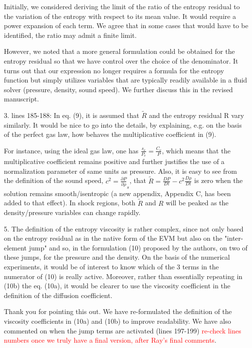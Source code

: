 \documentclass{article}
\newcommand{\tcr}[1]{\textcolor{red}{#1}}
\begin{document}
Initially, we considered deriving the limit of the ratio of the entropy residual to the variation of the entropy with respect to its mean value.  It would require a power expansion of each term. We agree that in some cases that would have to be identified, the ratio may admit a finite limit.

However, we noted that a more general formulation could be obtained for the entropy residual so that we have control over the choice of the denominator. It turns out that our expression no longer requires a formula for the entropy function but simply utilizes variables that are typically readily available in a fluid solver (pressure, density, sound speed). We further discuss this in the revised manuscript. 
\bigskip


{
\color{blue}
3. lines 185-188: In eq. (9), it is assumed that $\tilde{R}$ and the entropy residual R vary similarly. It would be nice to go into the details, by explaining, e.g. on the basis of the perfect gas law, how behaves the multiplicative coefficient in (9). 
}

For instance, using the ideal gas law, one has $\frac{s_e}{P_e} = \frac{C_v}{P}$,  which means that the multiplicative coefficient remains positive and further justifies the use of a normalization parameter of same units as pressure. Also, it is easy to see from the definition of the sound speed, $c^2 = \frac{\partial P}{\partial \rho}_s$, that $\tilde{R} = \frac{DP}{Dt}-c^2 \frac{D\rho}{Dt}$ is zero when the solution remains smooth/isentropic (a new appendix, Appendix C, has been added to that effect). In shock regions, both $\tilde{R}$ and $R$ will be peaked as the density/pressure variables can change rapidly.
\bigskip


{
\color{blue}
5. The definition of the entropy viscosity is rather complex, since not only based on  the entropy residual as in the native form of the EVM but also on  the "inter-element jump" and so, in the formulation (10) proposed by the authors, on two of these jumps, for the pressure and the density. On the basis of the numerical experiments, it  would be of interest to know which of the 3 terms in the numerator of (10) is really active.  Moreover, rather than essentially repeating in (10b) the eq. (10a), it would be clearer to use the viscosity coefficient in the definition of the diffusion coefficient.
}

Thank you for pointing this out. We have re-formulated the definition of the viscosity coefficients in (10a) and (10b) to improve readability. We have also commented on when the jump terms are activated (lines 197-199) \tcr{re-check lines numbers once we truly have a final version, after Ray's final comments}.
\bigskip
\end{document}
